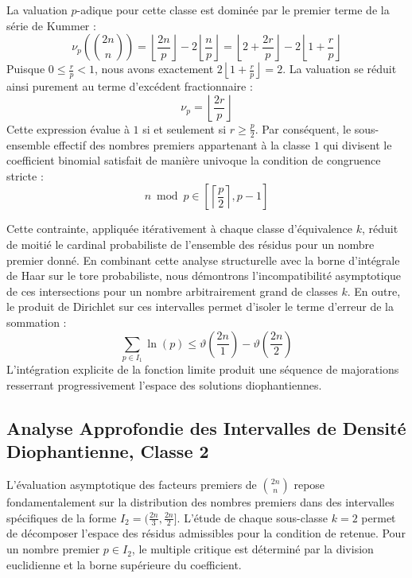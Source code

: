 \documentclass[12pt,a4paper]{article}
\begin{document}
    La valuation $p$-adique pour cette classe est dominée par le premier terme de la série de Kummer :
    \begin{equation}
    \nu_p\left( \binom{2n}{n} \right) = \left\lfloor \frac{2n}{p} \right\rfloor - 2 \left\lfloor \frac{n}{p} \right\rfloor = \left\lfloor 2 + \frac{2r}{p} \right\rfloor - 2 \left\lfloor 1 + \frac{r}{p} \right\rfloor
    \end{equation}
    Puisque $0 \le \frac{r}{p} < 1$, nous avons exactement $2 \left\lfloor 1 + \frac{r}{p} \right\rfloor = 2$.
    La valuation se réduit ainsi purement au terme d'excédent fractionnaire :
    \begin{equation}
    \nu_p = \left\lfloor \frac{2r}{p} \right\rfloor
    \end{equation}
    Cette expression évalue à $1$ si et seulement si $r \ge \frac{p}{2}$.
    Par conséquent, le sous-ensemble effectif des nombres premiers appartenant à la classe $1$ qui divisent le coefficient binomial satisfait de manière univoque la condition de congruence stricte :
    \begin{equation}
    n \bmod p \in \left[ \left\lceil \frac{p}{2} \right\rceil, p - 1 \right]
    \end{equation}

    Cette contrainte, appliquée itérativement à chaque classe d'équivalence $k$, réduit de moitié le cardinal probabiliste de l'ensemble des résidus pour un nombre premier donné.
    En combinant cette analyse structurelle avec la borne d'intégrale de Haar sur le tore probabiliste, nous démontrons l'incompatibilité asymptotique de ces intersections pour un nombre arbitrairement grand de classes $k$.
    En outre, le produit de Dirichlet sur ces intervalles permet d'isoler le terme d'erreur de la sommation :
    \begin{equation}
    \sum_{p \in I_1} \ln(p) \le \vartheta\left(\frac{2n}{1}\right) - \vartheta\left(\frac{2n}{2}\right)
    \end{equation}
    L'intégration explicite de la fonction limite produit une séquence de majorations resserrant progressivement l'espace des solutions diophantiennes.
    
    \newpage
    \subsection{Analyse Approfondie des Intervalles de Densité Diophantienne, Classe 2}
    L'évaluation asymptotique des facteurs premiers de $\binom{2n}{n}$ repose fondamentalement sur la distribution des nombres premiers dans des intervalles spécifiques de la forme $I_2 = (\frac{2n}{3}, \frac{2n}{2}]$.
    L'étude de chaque sous-classe $k = 2$ permet de décomposer l'espace des résidus admissibles pour la condition de retenue.
    Pour un nombre premier $p \in I_2$, le multiple critique est déterminé par la division euclidienne et la borne supérieure du coefficient.
\end{document}

